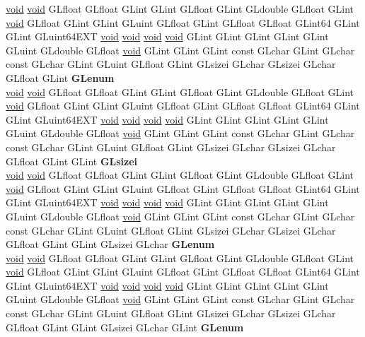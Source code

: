 \begin{DoxyCompactItemize}
\begin{tabbing}
\>\hyperlink{interfacevoid}{void} \hyperlink{interfacevoid}{void} GLfloat GLfloat GLint GLint GLfloat GLint GLdouble GLfloat GLint \hyperlink{interfacevoid}{void} GLfloat GLint GLint GLuint GLfloat GLint GLfloat GLfloat GLint64 GLint GLint GLuint64EXT \hyperlink{interfacevoid}{void} \hyperlink{interfacevoid}{void} \hyperlink{interfacevoid}{void} \hyperlink{interfacevoid}{void} GLint GLint GLint GLint GLint GLuint GLdouble GLfloat \hyperlink{interfacevoid}{void} GLint GLint GLint const GLchar GLint GLchar const GLchar GLint GLuint GLfloat GLint GLsizei GLchar GLsizei GLchar GLfloat GLint {\bfseries GLenum}\\
\>\hyperlink{interfacevoid}{void} \hyperlink{interfacevoid}{void} GLfloat GLfloat GLint GLint GLfloat GLint GLdouble GLfloat GLint \hyperlink{interfacevoid}{void} GLfloat GLint GLint GLuint GLfloat GLint GLfloat GLfloat GLint64 GLint GLint GLuint64EXT \hyperlink{interfacevoid}{void} \hyperlink{interfacevoid}{void} \hyperlink{interfacevoid}{void} \hyperlink{interfacevoid}{void} GLint GLint GLint GLint GLint GLuint GLdouble GLfloat \hyperlink{interfacevoid}{void} GLint GLint GLint const GLchar GLint GLchar const GLchar GLint GLuint GLfloat GLint GLsizei GLchar GLsizei GLchar GLfloat GLint GLint {\bfseries GLsizei}\\
\>\hyperlink{interfacevoid}{void} \hyperlink{interfacevoid}{void} GLfloat GLfloat GLint GLint GLfloat GLint GLdouble GLfloat GLint \hyperlink{interfacevoid}{void} GLfloat GLint GLint GLuint GLfloat GLint GLfloat GLfloat GLint64 GLint GLint GLuint64EXT \hyperlink{interfacevoid}{void} \hyperlink{interfacevoid}{void} \hyperlink{interfacevoid}{void} \hyperlink{interfacevoid}{void} GLint GLint GLint GLint GLint GLuint GLdouble GLfloat \hyperlink{interfacevoid}{void} GLint GLint GLint const GLchar GLint GLchar const GLchar GLint GLuint GLfloat GLint GLsizei GLchar GLsizei GLchar GLfloat GLint GLint GLsizei GLchar {\bfseries GLenum}\\
\>\hyperlink{interfacevoid}{void} \hyperlink{interfacevoid}{void} GLfloat GLfloat GLint GLint GLfloat GLint GLdouble GLfloat GLint \hyperlink{interfacevoid}{void} GLfloat GLint GLint GLuint GLfloat GLint GLfloat GLfloat GLint64 GLint GLint GLuint64EXT \hyperlink{interfacevoid}{void} \hyperlink{interfacevoid}{void} \hyperlink{interfacevoid}{void} \hyperlink{interfacevoid}{void} GLint GLint GLint GLint GLint GLuint GLdouble GLfloat \hyperlink{interfacevoid}{void} GLint GLint GLint const GLchar GLint GLchar const GLchar GLint GLuint GLfloat GLint GLsizei GLchar GLsizei GLchar GLfloat GLint GLint GLsizei GLchar GLint {\bfseries GLenum}\\

\end{tabbing}
\end{DoxyCompactItemize}

